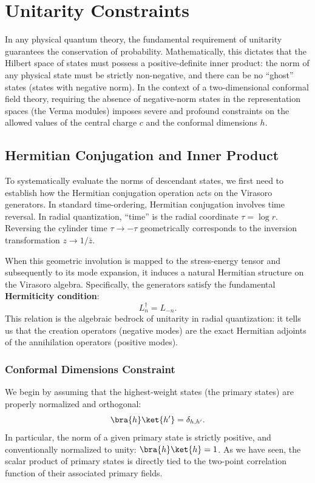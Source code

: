 \section{Unitarity Constraints}

In any physical quantum theory, the fundamental requirement of unitarity guarantees the conservation of probability. Mathematically, this dictates that the Hilbert space of states must possess a positive-definite inner product: the norm of any physical state must be strictly non-negative, and there can be no ``ghost'' states (states with negative norm). In the context of a two-dimensional conformal field theory, requiring the absence of negative-norm states in the representation spaces (the Verma modules) imposes severe and profound constraints on the allowed values of the central charge \(c\) and the conformal dimensions \(h\).

\subsection{Hermitian Conjugation and Inner Product}

To systematically evaluate the norms of descendant states, we first need to establish how the Hermitian conjugation operation acts on the Virasoro generators. In standard time-ordering, Hermitian conjugation involves time reversal. In radial quantization, ``time'' is the radial coordinate \(\tau = \log r\). Reversing the cylinder time \(\tau \to -\tau\) geometrically corresponds to the inversion transformation \(z \to 1/\bar{z}\).

When this geometric involution is mapped to the stress-energy tensor and subsequently to its mode expansion, it induces a natural Hermitian structure on the Virasoro algebra. Specifically, the generators satisfy the fundamental \textbf{Hermiticity condition}:
\[
    L_n^\dagger = L_{-n}.
\]
This relation is the algebraic bedrock of unitarity in radial quantization: it tells us that the creation operators (negative modes) are the exact Hermitian adjoints of the annihilation operators (positive modes).

\subsubsection{Conformal Dimensions Constraint}

We begin by assuming that the highest-weight states (the primary states) are properly normalized and orthogonal:
\[
    \bra{h}\ket{h^{\prime}} = \delta_{h,h^{\prime}}.
\]
In particular, the norm of a given primary state is strictly positive, and conventionally normalized to unity: \(\bra{h}\ket{h} = 1\). As we have seen, the scalar product of primary states is directly tied to the two-point correlation function of their associated primary fields.

